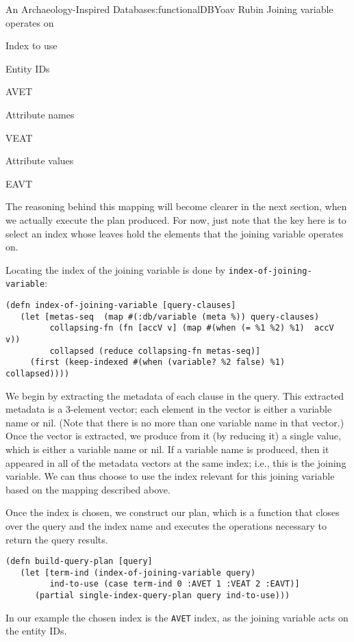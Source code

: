 \begin{aosachapter}{An Archaeology-Inspired Database}{s:functionalDB}{Yoav Rubin}
Joining variable operates on

Index to use

Entity IDs

AVET

Attribute names

VEAT

Attribute values

EAVT

The reasoning behind this mapping will become clearer in the next
section, when we actually execute the plan produced. For now, just note
that the key here is to select an index whose leaves hold the elements
that the joining variable operates on.

Locating the index of the joining variable is done by
\texttt{index-of-joining-variable}:

\begin{verbatim}
(defn index-of-joining-variable [query-clauses]
   (let [metas-seq  (map #(:db/variable (meta %)) query-clauses) 
         collapsing-fn (fn [accV v] (map #(when (= %1 %2) %1)  accV v))
         collapsed (reduce collapsing-fn metas-seq)] 
     (first (keep-indexed #(when (variable? %2 false) %1)  collapsed)))) 
\end{verbatim}

We begin by extracting the metadata of each clause in the query. This
extracted metadata is a 3-element vector; each element in the vector is
either a variable name or nil. (Note that there is no more than one
variable name in that vector.) Once the vector is extracted, we produce
from it (by reducing it) a single value, which is either a variable name
or nil. If a variable name is produced, then it appeared in all of the
metadata vectors at the same index; i.e., this is the joining variable.
We can thus choose to use the index relevant for this joining variable
based on the mapping described above.

Once the index is chosen, we construct our plan, which is a function
that closes over the query and the index name and executes the
operations necessary to return the query results.

\begin{verbatim}
(defn build-query-plan [query]
   (let [term-ind (index-of-joining-variable query)
         ind-to-use (case term-ind 0 :AVET 1 :VEAT 2 :EAVT)]
      (partial single-index-query-plan query ind-to-use)))
\end{verbatim}

In our example the chosen index is the \texttt{AVET} index, as the
joining variable acts on the entity IDs.


\end{aosachapter}
